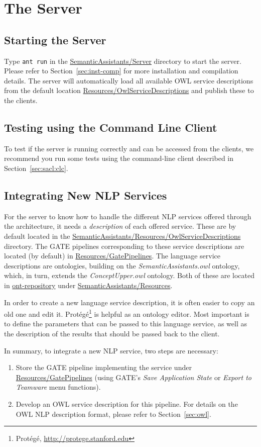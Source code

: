 \chapter{The \sa Server} 

\section{Starting the Server}
Type \texttt{ant run} in the \url{SemanticAssistants/Server} directory
to start the server. Please refer to Section~\ref{sec:inst-comp} for
more installation and compilation details. The server will
automatically load all available OWL service descriptions from the
default location \url{Resources/OwlServiceDescriptions} and publish
these to the clients.


\section{Testing using the Command Line Client}
To test if the server is running correctly and can be accessed from
the clients, we recommend you run some tests using the command-line
client described in Section~\ref{sec:sacl:clc}.


\section{Integrating New NLP Services}\label{sec:nlpservices}
For the server to know how to handle the different NLP services
offered through the architecture, it needs a \emph{description} of
each offered service. These are by default located in the
\url{SemanticAssistants/Resources/OwlServiceDescriptions}
directory. The GATE pipelines corresponding to these service
descriptions are located (by default) in
\url{Resources/GatePipelines}. The language service descriptions are
ontologies, building on the \emph{SemanticAssistants.owl} ontology,
which, in turn, extends the \emph{ConceptUpper.owl} ontology. Both of
these are located in \url{ont-repository} under
\url{SemanticAssistants/Resources}.

In order to create a new language service description, it is often
easier to copy an old one and edit
it. Prot\'{e}g\'{e}\footnote{Prot\'{e}g\'{e},
  \url{http://protege.stanford.edu}} is helpful as an ontology
editor. Most important is to define the parameters that can be passed
to this language service, as well as the description of the results
that should be passed back to the client.

In summary, to integrate a new NLP service, two steps are necessary:
\begin{enumerate}
\item Store the GATE pipeline implementing the service under
  \url{Resources/GatePipelines} (using GATE's \emph{Save Application State}
  or \emph{Export to Teamware} menu functions).
\item Develop an OWL service description for this pipeline.  For
  details on the OWL NLP description format, please refer to
  Section~\ref{sec:owl}.
\end{enumerate}